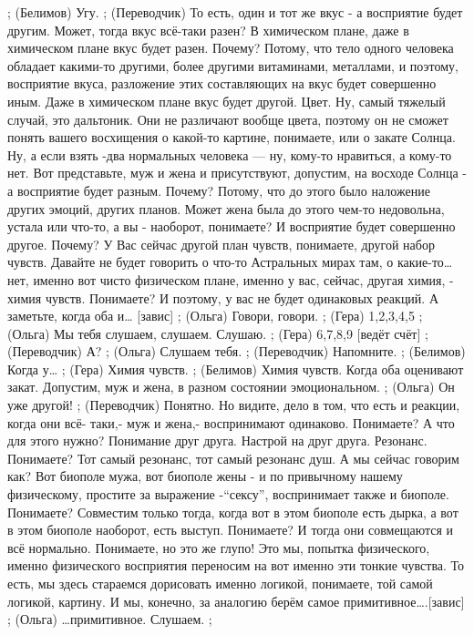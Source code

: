 ;	(Белимов) Угу.
;	(Переводчик) То есть, один и тот же вкус - а восприятие будет другим. Может, тогда вкус всё-таки разен? В химическом плане, даже в химическом плане вкус будет разен. Почему? Потому, что тело одного человека обладает какими-то другими, более другими витаминами, металлами, и поэтому, восприятие вкуса, разложение этих составляющих на вкус будет совершенно иным. Даже в химическом плане вкус будет другой. Цвет. Ну, самый тяжелый случай, это дальтоник. Они не различают вообще цвета, поэтому он не сможет понять вашего восхищения о какой-то картине, понимаете, или о закате Солнца. Ну, а если взять -два нормальных человека — ну, кому-то нравиться, а кому-то нет. Вот представьте, муж и жена и присутствуют, допустим, на восходе Солнца - а восприятие будет разным. Почему? Потому, что до этого было наложение других эмоций, других планов. Может жена была до этого чем-то недовольна, устала или что-то, а вы - наоборот, понимаете? И восприятие будет совершенно другое. Почему? У Вас сейчас другой план чувств, понимаете, другой набор чувств. Давайте не будет говорить о что-то Астральных мирах там, о какие-то… нет, именно вот чисто физическом плане, именно у вас, сейчас, другая химия, - химия чувств. Понимаете? И поэтому, у вас не будет одинаковых реакций. А заметьте, когда оба и… [завис]
;	(Ольга) Говори, говори.
;	(Гера) 1,2,3,4,5
;	(Ольга) Мы тебя слушаем, слушаем. Слушаю.
;	(Гера) 6,7,8,9 [ведёт счёт]
;	(Переводчик)  А?
;	(Ольга) Слушаем тебя.
;	(Переводчик)  Напомните. 
;	(Белимов) Когда у…
;	(Гера) Химия чувств.
;	(Белимов) Химия чувств. Когда оба оценивают закат. Допустим, муж и жена, в разном состоянии эмоциональном.
;	(Ольга) Он уже другой!
;	(Переводчик)  Понятно.  Но видите, дело в том, что есть и реакции, когда они всё- таки,- муж и жена,- воспринимают одинаково. Понимаете? А что для этого нужно? Понимание друг друга. Настрой на друг друга. Резонанс. Понимаете? Тот самый резонанс, тот самый резонанс душ. А мы сейчас говорим как? Вот биополе мужа, вот биополе жены - и по привычному нашему физическому, простите за выражение -“сексу'', воспринимает также и биополе. Понимаете? Совместим только тогда, когда вот в этом биополе есть дырка, а вот в этом биополе наоборот, есть выступ. Понимаете? И тогда они совмещаются и всё нормально. Понимаете, но это же глупо! Это мы, попытка физического, именно физического восприятия переносим на вот именно эти тонкие чувства. То есть, мы здесь стараемся дорисовать именно логикой, понимаете, той самой логикой, картину.  И мы, конечно, за аналогию берём самое примитивное….[завис]
;	(Ольга) …примитивное. Слушаем.
;	
